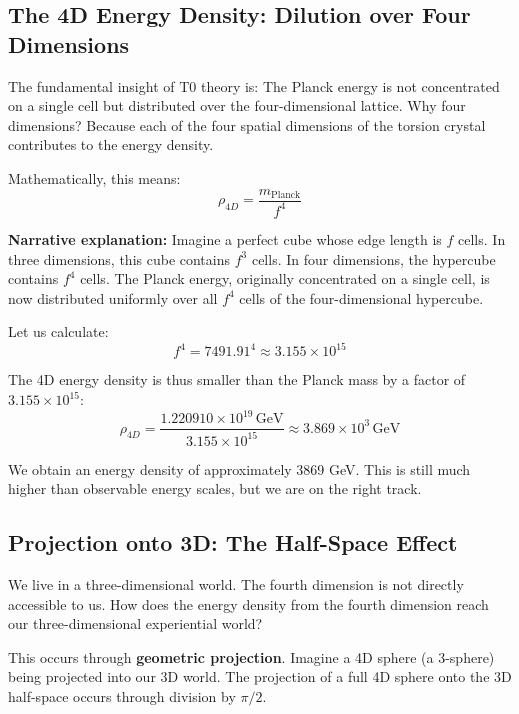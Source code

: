 	\subsection{The 4D Energy Density: Dilution over Four Dimensions}
	
	The fundamental insight of T0 theory is: The Planck energy is not concentrated on a single cell but distributed over the four-dimensional lattice. Why four dimensions? Because each of the four spatial dimensions of the torsion crystal contributes to the energy density.
	
	Mathematically, this means:
	\begin{equation}
		\boxed{\rho_{4D} = \frac{m_{\text{Planck}}}{f^4}}
	\end{equation}
	
	\textbf{Narrative explanation:} Imagine a perfect cube whose edge length is \(f\) cells. In three dimensions, this cube contains \(f^3\) cells. In four dimensions, the hypercube contains \(f^4\) cells. The Planck energy, originally concentrated on a single cell, is now distributed uniformly over all \(f^4\) cells of the four-dimensional hypercube.
	
	Let us calculate:
	\begin{equation}
		f^4 = 7491.91^4 \approx 3.155 \times 10^{15}
	\end{equation}
	
	The 4D energy density is thus smaller than the Planck mass by a factor of \(3.155 \times 10^{15}\):
	\begin{equation}
		\rho_{4D} = \frac{1.220910 \times 10^{19}\,\text{GeV}}{3.155 \times 10^{15}} \approx 3.869 \times 10^{3}\,\text{GeV}
	\end{equation}
	
	We obtain an energy density of approximately 3869 GeV. This is still much higher than observable energy scales, but we are on the right track.
	
	\subsection{Projection onto 3D: The Half-Space Effect}
	
	We live in a three-dimensional world. The fourth dimension is not directly accessible to us. How does the energy density from the fourth dimension reach our three-dimensional experiential world?
	
	This occurs through \textbf{geometric projection}. Imagine a 4D sphere (a 3-sphere) being projected into our 3D world. The projection of a full 4D sphere onto the 3D half-space occurs through division by \(\pi/2\).
	
